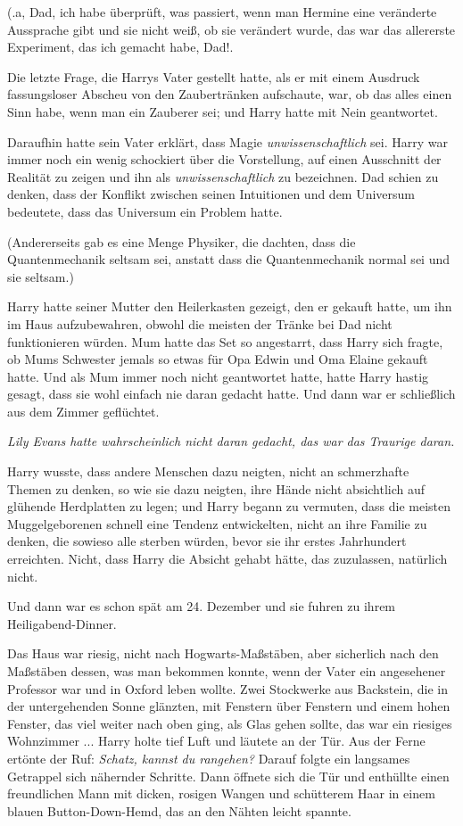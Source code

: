 (\grqq{}.a, Dad, ich habe überprüft, was passiert, wenn man Hermine eine
veränderte Aussprache gibt und sie nicht weiß, ob sie verändert wurde, das war
das allererste Experiment, das ich gemacht habe, Dad!\grqq{}.

Die letzte Frage, die Harrys Vater gestellt hatte, als er mit einem Ausdruck
fassungsloser Abscheu von den Zaubertränken aufschaute, war, ob das alles einen
Sinn habe, wenn man ein Zauberer sei; und Harry hatte mit Nein geantwortet.

Daraufhin hatte sein Vater erklärt, dass Magie \emph{unwissenschaftlich} sei.
Harry war immer noch ein wenig schockiert über die Vorstellung, auf einen
Ausschnitt der Realität zu zeigen und ihn als \emph{unwissenschaftlich} zu
bezeichnen. Dad schien zu denken, dass der Konflikt zwischen seinen Intuitionen
und dem Universum bedeutete, dass das Universum ein Problem hatte.

(Andererseits gab es eine Menge Physiker, die dachten, dass die Quantenmechanik
seltsam sei, anstatt dass die Quantenmechanik normal sei und sie seltsam.)

Harry hatte seiner Mutter den Heilerkasten gezeigt, den er gekauft hatte, um ihn
im Haus aufzubewahren, obwohl die meisten der Tränke bei Dad nicht funktionieren
würden. Mum hatte das Set so angestarrt, dass Harry sich fragte, ob Mums
Schwester jemals so etwas für Opa Edwin und Oma Elaine gekauft hatte. Und als
Mum immer noch nicht geantwortet hatte, hatte Harry hastig gesagt, dass sie wohl
einfach nie daran gedacht hatte. Und dann war er schließlich aus dem Zimmer
geflüchtet.

\emph{Lily Evans hatte wahrscheinlich nicht daran gedacht, das war das Traurige
daran.}

Harry wusste, dass andere Menschen dazu neigten, nicht an schmerzhafte Themen zu
denken, so wie sie dazu neigten, ihre Hände nicht absichtlich auf glühende
Herdplatten zu legen; und Harry begann zu vermuten, dass die meisten
Muggelgeborenen schnell eine Tendenz entwickelten, nicht an ihre Familie zu
denken, die sowieso alle sterben würden, bevor sie ihr erstes Jahrhundert
erreichten. Nicht, dass Harry die Absicht gehabt hätte, das zuzulassen,
natürlich nicht.

Und dann war es schon spät am 24. Dezember und sie fuhren zu ihrem
Heiligabend-Dinner.

Das Haus war riesig, nicht nach Hogwarts-Maßstäben, aber sicherlich nach den
Maßstäben dessen, was man bekommen konnte, wenn der Vater ein angesehener
Professor war und in Oxford leben wollte. Zwei Stockwerke aus Backstein, die in
der untergehenden Sonne glänzten, mit Fenstern über Fenstern und einem hohen
Fenster, das viel weiter nach oben ging, als Glas gehen sollte, das war ein
riesiges Wohnzimmer ... Harry holte tief Luft und läutete an der Tür. Aus der
Ferne ertönte der Ruf: \glqq{}\emph{Schatz, kannst du rangehen?}\grqq{} Darauf
folgte ein langsames Getrappel sich nähernder Schritte. Dann öffnete sich die
Tür und enthüllte einen freundlichen Mann mit dicken, rosigen Wangen und
schütterem Haar in einem blauen Button-Down-Hemd, das an den Nähten leicht
spannte.

